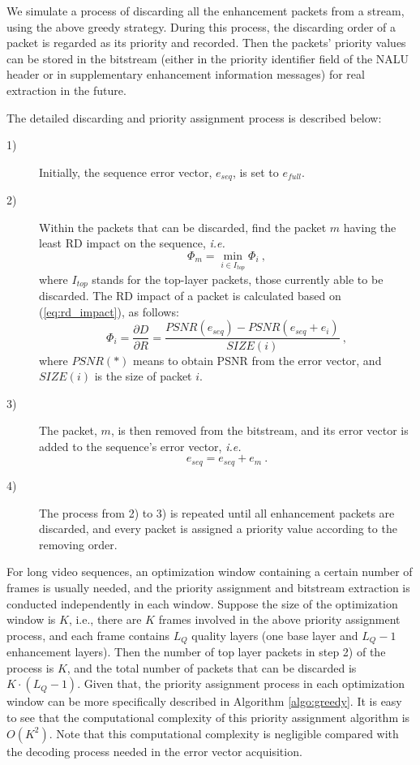 \documentclass[journal]{IEEEtran}
\begin{document}
We simulate a process of discarding all the enhancement packets from a stream, using the above greedy strategy. During this process, the discarding order of a packet is regarded as its priority and recorded. Then the packets' priority values can be stored in the bitstream (either in the priority identifier field of the NALU header or in supplementary enhancement information messages) for real extraction in the future.

The detailed discarding and priority assignment process is described below:
\begin{description}
\item[1)] Initially, the sequence error vector, $e_{seq}$, is set to $e_{full}$.
\item[2)] Within the packets that can be discarded, find the packet $m$ having the least RD impact on the sequence, \textit{i.e. }
\begin{equation}
\label{eq:R-D_impact_m}
\Phi_m = \min_{i \in I_{top}} \Phi_i \: ,
\end{equation}
where $I_{top}$ stands for the top-layer packets, those currently able to be discarded. The RD impact of a packet is calculated based on (\ref{eq:rd_impact}), as follows: 
\begin{equation}
\label{eq:R-D_impact_i}
\Phi_i = \dfrac{\partial D}{\partial R} = \dfrac{PSNR(e_{seq}) - PSNR(e_{seq} + e_i)}{SIZE(i)} \: ,
\end{equation}
where $PSNR(*)$ means to obtain PSNR from the error vector, and $SIZE(i)$ is the size of packet $i$.
\item[3)]The packet, $m$, is then removed from the bitstream, and its error vector is added to the sequence's error vector, \textit{i.e.}
\begin{equation}
\label{eq:error_update}
e_{seq} = e_{seq} + e_m \: .
\end{equation}
\item[4)]The process from 2) to 3) is repeated until all enhancement packets are discarded, and every packet is assigned a priority value according to the removing order.
\end{description}

For long video sequences, an optimization window containing a certain number of frames is usually needed, and the priority assignment and bitstream extraction is conducted independently in each window. Suppose the size of the optimization window is $K$, i.e., there are $K$ frames involved in the above priority assignment process, and each frame contains $L_Q$ quality layers (one base layer and $L_Q-1$ enhancement layers). Then the number of top layer packets in step 2) of the process is $K$, and the total number of packets that can be discarded is $K \cdot (L_Q-1)$. Given that, the priority assignment process in each optimization window can be more specifically described in Algorithm \ref{algo:greedy}. It is easy to see that the computational complexity of this priority assignment algorithm is $O(K^2)$. Note that this computational complexity is negligible compared with the decoding process needed in the error vector acquisition.
\end{document}

